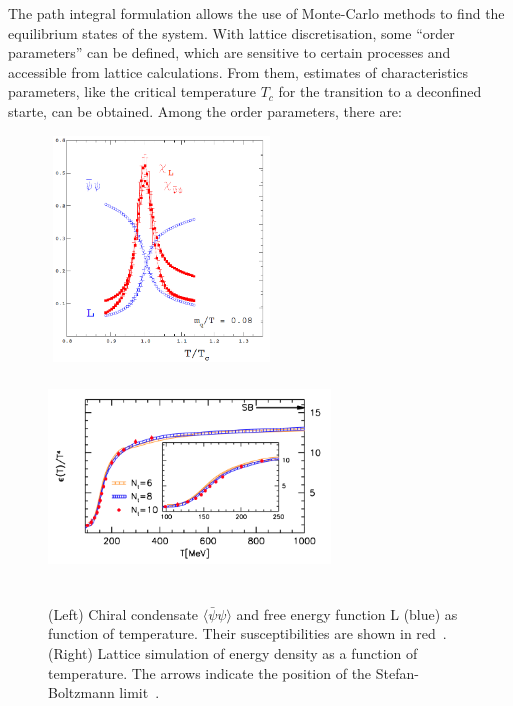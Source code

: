 The path integral 
formulation allows the use of Monte-Carlo methods to find the equilibrium states of the system. 
With lattice discretisation, some ``order parameters'' can be defined, which are 
sensitive to certain processes and accessible from lattice calculations. From them, 
estimates of characteristics parameters, like the critical temperature $T_c$ for the transition
to a deconfined starte, can be obtained. Among the order parameters, there are:
\begin{figure}[!t]
\includegraphics[width=6cm,height=6cm]{FigCap1/Lattice1.png} 
\includegraphics[width=7.5cm,height=5.8cm]{FigCap1/BW_EnDensity.png}
 \caption{(Left) Chiral condensate $\langle \bar{\psi}\psi\rangle$ and free energy function L (blue) as function of temperature. Their susceptibilities are shown in red~\cite{Karsch:2001vs}. (Right) Lattice simulation of energy density as a function of temperature. The arrows indicate the position of the Stefan-Boltzmann limit~\cite{Borsanyi:2010cj}.}
\label{fig:Lattice}
\end{figure}

